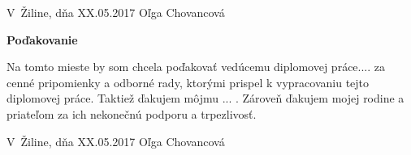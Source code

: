 \vspace{2em}

\noindent
V~Žiline, dňa XX.05.2017
\hfill
Oľga Chovancová

\newpage


\newpage

\centerline{\bf Poďakovanie}
\vspace{2em}
\noindent

\bigskip

Na tomto mieste by som chcela poďakovať vedúcemu diplomovej práce....  za cenné pripomienky a odborné rady, ktorými prispel k vypracovaniu tejto diplomovej práce. Taktiež ďakujem môjmu ... . Zároveň ďakujem mojej rodine a priateľom za ich nekonečnú podporu a trpezlivosť. 

\vspace{2em}

\noindent
V~Žiline, dňa XX.05.2017
\hfill
Oľga Chovancová